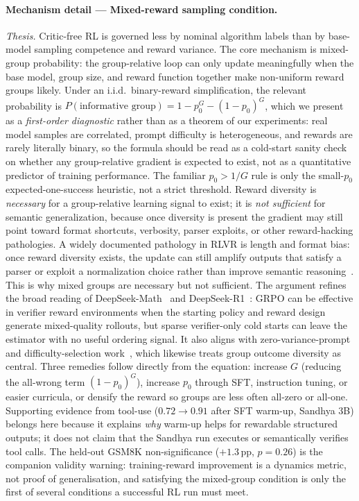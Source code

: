 \documentclass[12pt,a4paper]{report}
\begin{document}
\paragraph{Mechanism detail --- Mixed-reward sampling condition.}
\emph{Thesis.} Critic-free RL is governed less by nominal algorithm labels than by base-model sampling competence and reward variance. The core mechanism is mixed-group probability: the group-relative loop can only update meaningfully when the base model, group size, and reward function together make non-uniform reward groups likely. Under an i.i.d.\ binary-reward simplification, the relevant probability is $P(\text{informative group}) = 1 - p_0^{G} - (1-p_0)^{G}$, which we present as a \emph{first-order diagnostic} rather than as a theorem of our experiments: real model samples are correlated, prompt difficulty is heterogeneous, and rewards are rarely literally binary, so the formula should be read as a cold-start sanity check on whether any group-relative gradient is expected to exist, not as a quantitative predictor of training performance. The familiar $p_0 > 1/G$ rule is only the small-$p_0$ expected-one-success heuristic, not a strict threshold. Reward diversity is \emph{necessary} for a group-relative learning signal to exist; it is \emph{not sufficient} for semantic generalization, because once diversity is present the gradient may still point toward format shortcuts, verbosity, parser exploits, or other reward-hacking pathologies. 
A widely documented pathology in RLVR is length and format bias: once reward diversity exists, the update can still amplify outputs that satisfy a parser or exploit a normalization choice rather than improve semantic reasoning~\citep{gao2023scaling,liu2025r1zerocritical,shao2025spurious}. This is why mixed groups are necessary but not sufficient. The argument refines the broad reading of DeepSeek-Math~\citep{shao2024deepseekmath} and DeepSeek-R1~\citep{deepseek2025r1}: GRPO can be effective in verifier reward environments when the starting policy and reward design generate mixed-quality rollouts, but sparse verifier-only cold starts can leave the estimator with no useful ordering signal. It also aligns with zero-variance-prompt and difficulty-selection work~\citep{rlzvp2025,bae2025online,rcgrpo2026,pikus2025hardexamples}, which likewise treats group outcome diversity as central. Three remedies follow directly from the equation: increase $G$ (reducing the all-wrong term $(1-p_0)^G$), increase $p_0$ through SFT, instruction tuning, or easier curricula, or densify the reward so groups are less often all-zero or all-one. Supporting evidence from tool-use ($0.72 \to 0.91$ after SFT warm-up, Sandhya 3B) belongs here because it explains \emph{why} warm-up helps for rewardable structured outputs; it does not claim that the Sandhya run executes or semantically verifies tool calls. The held-out GSM8K non-significance ($+1.3$\,pp, $p{=}0.26$) is the companion validity warning: training-reward improvement is a dynamics metric, not proof of generalisation, and satisfying the mixed-group condition is only the first of several conditions a successful RL run must meet.
\end{document}
